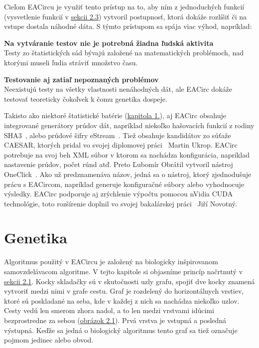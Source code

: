 Cieľom EACircu je využiť tento prístup na to, aby ním z jednoduchých funkcií (vysvetlenie funkcií v \hyperref[sec:nodes]{sekcii 2.3}) vytvoril postupnosť, ktorá dokáže rozlíšiť či na vstupe dostala náhodné dáta. S týmto prístupom sa spája viac výhod, napríklad:
\begin{myItemize}
	\item \textbf{Na vytváranie testov nie je potrebná žiadna ľudská aktivita}\\Testy zo štatistických sád bývajú založené na matematických problémoch, nad ktorými museli ľudia stráviť množstvo času.
	\item \textbf{Testovanie aj zatiaľ nepoznaných problémov}\\Neexistujú testy na všetky vlastnosti nenáhodných dát, ale EACirc dokáže testovať teoreticky čokoľvek k čomu genetika dospeje.
\end{myItemize}

Takisto ako niektoré štatistické batérie (\hyperref[chap:statistic-tests]{kapitola 1.}), aj EACirc obsahuje integrované generátory prúdov dát, napríklad niekoľko hašovacích funkcií z rodiny SHA3~\parencite{thesis-dubovec}, alebo prúdové šifry eStream~\parencite{thesis-pristak}. Tiež obsahuje kandidátov zo súťaže CAESAR, ktorých pridal vo svojej {diplomovej práci}~\parencite{ukrop-master} Martin Ukrop. EACirc potrebuje na svoj beh XML súbor v ktorom sa nachádza konfigurácia, napríklad nastavenie prúdov, počet rúnd atď. Preto Ľubomír Obrátil vytvoril nástroj OneClick~\parencite{obratil-bc}. Ako už predznamenáva názov, jedná sa o nástroj, ktorý zjednodušuje prácu s EACircom, napríklad generuje konfiguračné súbory alebo vyhodnocuje výsledky. EACirc podporuje aj zrýchlenie výpočtu pomocou nVidia CUDA technológie, toto rozšírenie doplnil vo svojej {bakalárskej práci}~\parencite{novotny-bc} Jiří Novotný. 

\section{Genetika}
\label{sec:genetics}

Algoritmus použitý v EACircu je založený na biologicky inšpirovanom samovzdelávacom algoritme. V tejto kapitole si objasníme princíp načrtnutý v \hyperref[sec:nodes]{sekcii 2.1}. Kocky skladačky sú v skutočnosti uzly grafu, spojiť dve kocky znamená vytvoriť medzi nimi v grafe cestu. Graf je rozdelený do horizontálnych vrstiev, ktoré sú poskladané na seba, kde v každej z nich sa nachádza niekoľko uzlov. Cesty vedú len smerom zhora nadol, a to len medzi vrstvami idúcimi bezprostredne za sebou (\hyperref[obr:circuit-example]{obrázok 2.1}). Prvá vrstva je vstupná a posledná výstupná. Keďže sa jedná o biologický algoritmus tento graf sa tiež označuje pojmom jedinec alebo obvod.

